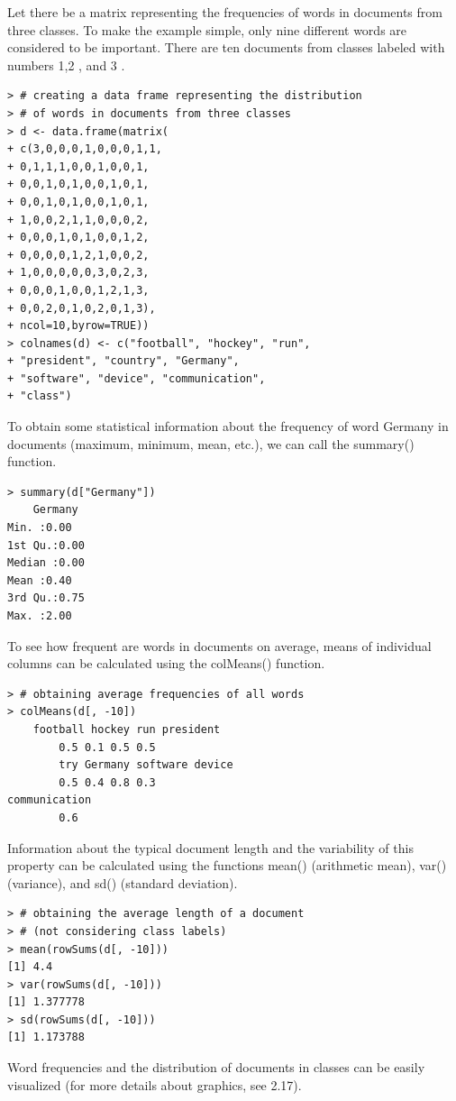 \documentclass[10pt]{book}
\begin{document}
Let there be a matrix representing the frequencies of words in documents from three classes. To make the example simple, only nine different words are considered to be important. There are ten documents from classes labeled with numbers 1,2 , and 3 .

\begin{verbatim}
> # creating a data frame representing the distribution
> # of words in documents from three classes
> d <- data.frame(matrix(
+ c(3,0,0,0,1,0,0,0,1,1,
+ 0,1,1,1,0,0,1,0,0,1,
+ 0,0,1,0,1,0,0,1,0,1,
+ 0,0,1,0,1,0,0,1,0,1,
+ 1,0,0,2,1,1,0,0,0,2,
+ 0,0,0,1,0,1,0,0,1,2,
+ 0,0,0,0,1,2,1,0,0,2,
+ 1,0,0,0,0,0,3,0,2,3,
+ 0,0,0,1,0,0,1,2,1,3,
+ 0,0,2,0,1,0,2,0,1,3),
+ ncol=10,byrow=TRUE))
> colnames(d) <- c("football", "hockey", "run",
+ "president", "country", "Germany",
+ "software", "device", "communication",
+ "class")
\end{verbatim}

To obtain some statistical information about the frequency of word Germany in documents (maximum, minimum, mean, etc.), we can call the summary() function.

\begin{verbatim}
> summary(d["Germany"])
    Germany
Min. :0.00
1st Qu.:0.00
Median :0.00
Mean :0.40
3rd Qu.:0.75
Max. :2.00
\end{verbatim}

To see how frequent are words in documents on average, means of individual columns can be calculated using the colMeans() function.

\begin{verbatim}
> # obtaining average frequencies of all words
> colMeans(d[, -10])
    football hockey run president
        0.5 0.1 0.5 0.5
        try Germany software device
        0.5 0.4 0.8 0.3
communication
        0.6
\end{verbatim}

Information about the typical document length and the variability of this property can be calculated using the functions mean() (arithmetic mean), var() (variance), and sd() (standard deviation).

\begin{verbatim}
> # obtaining the average length of a document
> # (not considering class labels)
> mean(rowSums(d[, -10]))
[1] 4.4
> var(rowSums(d[, -10]))
[1] 1.377778
> sd(rowSums(d[, -10]))
[1] 1.173788
\end{verbatim}

Word frequencies and the distribution of documents in classes can be easily visualized (for more details about graphics, see 2.17).
\end{document}
